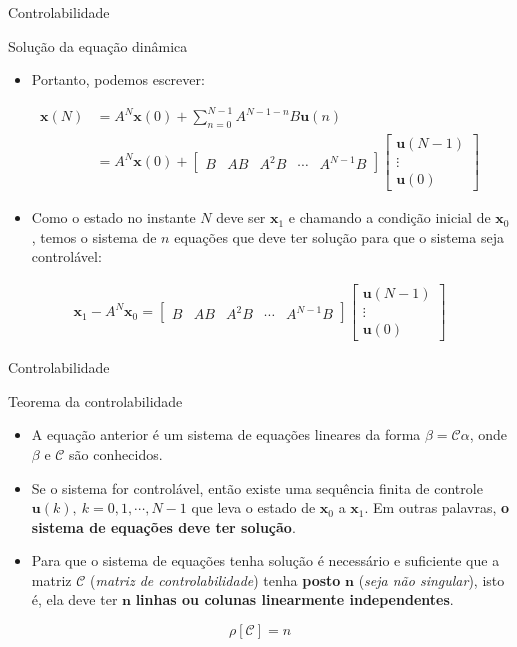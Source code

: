 \begin{frame}{Controlabilidade}
\begin{block}{Solução da equação dinâmica}
\begin{itemize}
    \item Portanto, podemos escrever:
\end{itemize}
\begin{align*}
    \bm{x}(N) &= A^N\bm{x}(0) + \sum_{n=0}^{N-1} A^{N-1-n} B\bm{u}(n) \\
    &= A^N\bm{x}(0) + \begin{bmatrix} B & AB & A^2B & \cdots & A^{N-1}B \end{bmatrix}
    \begin{bmatrix} \bm{u}(N-1) \\ \vdots \\ \bm{u}(0) \end{bmatrix}
\end{align*}
\vspace{-0.3cm}
\begin{itemize}
    \item Como o estado no instante $N$ deve ser $\bm{x}_1$ e  chamando a condição inicial de $\bm{x}_0$, temos o  sistema de $n$ equações que deve ter solução para que o sistema seja controlável:
\end{itemize}
\vspace{-0.4cm}
\begin{align*}
    \bm{x}_1 - A^N\bm{x}_0 = \begin{bmatrix} B & AB & A^2B & \cdots & A^{N-1}B \end{bmatrix}
    \begin{bmatrix} \bm{u}(N-1) \\ \vdots \\ \bm{u}(0) \end{bmatrix}
\end{align*}
\end{block}
\end{frame}

\begin{frame}{Controlabilidade}
\begin{block}{Teorema da controlabilidade}
\begin{itemize}
    \item A equação anterior é um sistema de equações lineares da forma $\beta = \mathcal{C} \alpha$, onde $\beta$ e $\mathcal{C}$ são conhecidos.
    \item Se o sistema for controlável, então existe  uma sequência finita de controle $\bm{u}(k), \ k =  0, 1, \cdots, N-1$ que leva o estado de $\bm{x}_0$ a $\bm{x}_1$. Em outras palavras, \textbf{o sistema de equações deve ter solução}.
    \item Para que o sistema de equações tenha solução é necessário e suficiente que a  matriz $\mathcal{C}$ (\textit{matriz de controlabilidade}) tenha \textbf{posto} $\bm{n}$ (\textit{seja não singular}), isto é, ela deve ter $\bm{n}$ \textbf{linhas ou colunas linearmente independentes}.
\end{itemize}
$$\boxed{\rho[\mathcal{C}] = n}$$
\end{block}
\end{frame}

